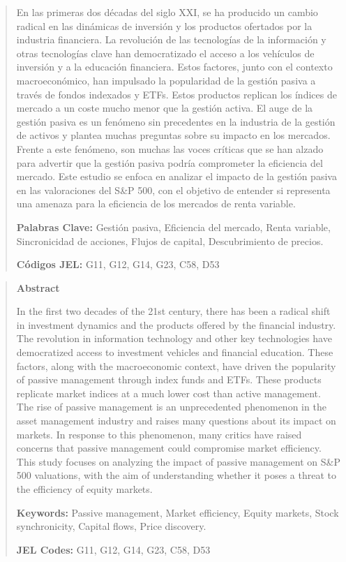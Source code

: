 \documentclass[12pt,a4paper]{article}
\begin{document}
\begin{abstract}
\noindent
En las primeras dos décadas del siglo XXI, se ha producido un cambio radical en las dinámicas de inversión y los productos ofertados por la industria financiera. La revolución de las tecnologías de la información y otras tecnologías clave han democratizado el acceso a los vehículos de inversión y a la educación financiera. Estos factores, junto con el contexto macroeconómico, han impulsado la popularidad de la gestión pasiva a través de fondos indexados y ETFs. Estos productos replican los índices de mercado a un coste mucho menor que la gestión activa. El auge de la gestión pasiva es un fenómeno sin precedentes en la industria de la gestión de activos y plantea muchas preguntas sobre su impacto en los mercados. Frente a este fenómeno, son muchas las voces críticas que se han alzado para advertir que la gestión pasiva podría comprometer la eficiencia del mercado. Este estudio se enfoca en analizar el impacto de la gestión pasiva en las valoraciones del S\&P 500, con el objetivo de entender si representa una amenaza para la eficiencia de los mercados de renta variable.

\textbf{Palabras Clave:} Gestión pasiva, Eficiencia del mercado, Renta variable, Sincronicidad de acciones, Flujos de capital, Descubrimiento de precios.

\textbf{Códigos JEL:} G11, G12, G14, G23, C58, D53
\end{abstract}

\begin{abstract}
\textbf{Abstract}

\noindent
In the first two decades of the 21st century, there has been a radical shift in investment dynamics and the products offered by the financial industry. The revolution in information technology and other key technologies have democratized access to investment vehicles and financial education. These factors, along with the macroeconomic context, have driven the popularity of passive management through index funds and ETFs. These products replicate market indices at a much lower cost than active management. The rise of passive management is an unprecedented phenomenon in the asset management industry and raises many questions about its impact on markets. In response to this phenomenon, many critics have raised concerns that passive management could compromise market efficiency. This study focuses on analyzing the impact of passive management on S\&P 500 valuations, with the aim of understanding whether it poses a threat to the efficiency of equity markets.

\textbf{Keywords:} Passive management, Market efficiency, Equity markets, Stock synchronicity, Capital flows, Price discovery.

\textbf{JEL Codes:} G11, G12, G14, G23, C58, D53
\end{abstract}
\end{document}

